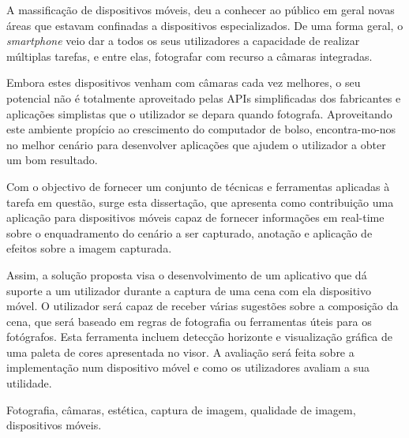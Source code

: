 \abstractPT 
A massificação de dispositivos móveis, deu a conhecer ao público em geral novas áreas que estavam confinadas a dispositivos especializados. De uma forma geral, o \emph{smartphone} veio dar a todos os seus utilizadores a capacidade de realizar múltiplas tarefas, e entre elas, fotografar com recurso a câmaras integradas.


Embora estes dispositivos venham com câmaras cada vez melhores, o seu potencial não é totalmente aproveitado pelas APIs simplificadas dos fabricantes e aplicações simplistas que o utilizador se depara quando fotografa. Aproveitando este ambiente propício ao crescimento do computador de bolso, encontra-mo-nos no melhor cenário para desenvolver aplicações que ajudem o utilizador a obter um bom resultado.


Com o objectivo de fornecer um conjunto de técnicas e ferramentas aplicadas à tarefa em questão, surge esta dissertação, que apresenta como contribuição uma aplicação para dispositivos móveis capaz de fornecer informações em real-time sobre o enquadramento do cenário a ser capturado, anotação e aplicação de efeitos sobre a imagem capturada.



Assim, a solução proposta visa o desenvolvimento de um aplicativo que dá suporte a um utilizador durante a captura de uma cena com ela dispositivo móvel. O utilizador será capaz de receber várias sugestões sobre a composição da cena, que será baseado em regras de fotografia ou ferramentas úteis para os fotógrafos. Esta ferramenta incluem detecção horizonte e visualização gráfica de uma paleta de cores apresentada no visor. A avaliação será feita sobre a implementação num dispositivo móvel e como os utilizadores avaliam a sua utilidade.

\begin{keywords}
Fotografia, câmaras, estética, captura de imagem, qualidade de imagem, dispositivos móveis.
\end{keywords}
